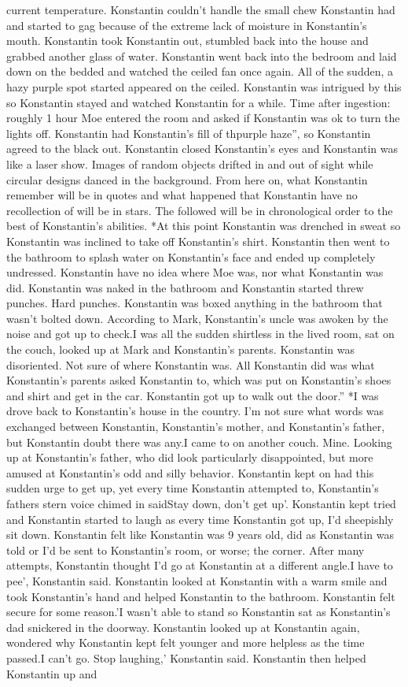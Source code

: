 \documentclass[12pt]{book}
\begin{document}
current temperature. Konstantin couldn't handle the small chew Konstantin had and started to gag because of the extreme lack of moisture in Konstantin's mouth. Konstantin took Konstantin out, stumbled back into the house and grabbed another glass of water. Konstantin went back into the bedroom and laid down on the bedded and watched the ceiled fan once again. All of the sudden, a hazy purple spot started appeared on the ceiled. Konstantin was intrigued by this so Konstantin stayed and watched Konstantin for a while. Time after ingestion: roughly 1 hour Moe entered the room and asked if Konstantin was ok to turn the lights off. Konstantin had Konstantin's fill of thpurple haze'', so Konstantin agreed to the black out. Konstantin closed Konstantin's eyes and Konstantin was like a laser show. Images of random objects drifted in and out of sight while circular designs danced in the background. From here on, what Konstantin remember will be in quotes and what happened that Konstantin have no recollection of will be in stars. The followed will be in chronological order to the best of Konstantin's abilities. *At this point Konstantin was drenched in sweat so Konstantin was inclined to take off Konstantin's shirt. Konstantin then went to the bathroom to splash water on Konstantin's face and ended up completely undressed. Konstantin have no idea where Moe was, nor what Konstantin was did. Konstantin was naked in the bathroom and Konstantin started threw punches. Hard punches. Konstantin was boxed anything in the bathroom that wasn't bolted down. According to Mark, Konstantin's uncle was awoken by the noise and got up to check.I was all the sudden shirtless in the lived room, sat on the couch, looked up at Mark and Konstantin's parents. Konstantin was disoriented. Not sure of where Konstantin was. All Konstantin did was what Konstantin's parents asked Konstantin to, which was put on Konstantin's shoes and shirt and get in the car. Konstantin got up to walk out the door.'' *I was drove back to Konstantin's house in the country. I'm not sure what words was exchanged between Konstantin, Konstantin's mother, and Konstantin's father, but Konstantin doubt there was any.I came to on another couch. Mine. Looking up at Konstantin's father, who did look particularly disappointed, but more amused at Konstantin's odd and silly behavior. Konstantin kept on had this sudden urge to get up, yet every time Konstantin attempted to, Konstantin's fathers stern voice chimed in saidStay down, don't get up'. Konstantin kept tried and Konstantin started to laugh as every time Konstantin got up, I'd sheepishly sit down. Konstantin felt like Konstantin was 9 years old, did as Konstantin was told or I'd be sent to Konstantin's room, or worse; the corner. After many attempts, Konstantin thought I'd go at Konstantin at a different angle.I have to pee', Konstantin said. Konstantin looked at Konstantin with a warm smile and took Konstantin's hand and helped Konstantin to the bathroom. Konstantin felt secure for some reason.'I wasn't able to stand so Konstantin sat as Konstantin's dad snickered in the doorway. Konstantin looked up at Konstantin again, wondered why Konstantin kept felt younger and more helpless as the time passed.I can't go. Stop laughing,' Konstantin said. Konstantin then helped Konstantin up and 
\end{document}
